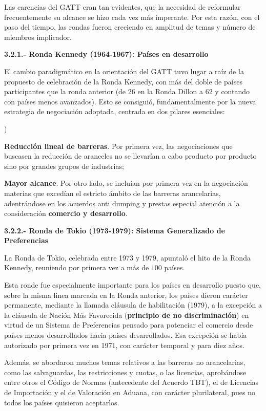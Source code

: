 \documentclass[10pt,a4paper]{article}
\newcounter{alphaitem}
\newenvironment{la}
      {\begin{list}{\alph{alphaitem})}{%
          \usecounter{alphaitem}%
          \setlength{\leftmargin}{1cm}%
          \setlength{\parskip}{3pt}%
          \setlength{\itemsep}{0pt}%
          \setlength{\parsep}{0pt}%
      }}
      {\end{list}}
\begin{document}
Las carencias del GATT eran tan evidentes, que la necesidad de reformular frecuentemente su alcance se hizo cada vez más imperante. Por esta razón, con el paso del tiempo, las rondas fueron creciendo en amplitud de temas y número de miembros implicador. 

\textbf{3.2.1.- Ronda Kennedy (1964-1967): Países en desarrollo}

El cambio paradigmático en la orientación del GATT tuvo lugar a raíz de la propuesto de celebración de la Ronda Kennedy, con más del doble de países participantes que la ronda anterior (de $26$ en la Ronda Dillon a $62$ y contando con países menos avanzados). Esto se consiguió, fundamentalmente por la nueva estrategia de negociación adoptada, centrada en dos pilares esenciales:
\begin{la}
    \item \textbf{Reducción lineal de barreras}. Por primera vez, las negociaciones que buscasen la reducción de aranceles no se llevarían a cabo producto por producto sino por grandes grupos de industrias;
    \item \textbf{Mayor alcance}. Por otro lado, se incluían por primera vez en la negociación materias que excedían el estricto ámbito de las barreras arancelarias, adentrándose en los acuerdos anti dumping y prestas especial atención a la consideración \textbf{comercio y desarrollo}.
\end{la}

\textbf{3.2.2.- Ronda de Tokio (1973-1979): Sistema Generalizado de Preferencias}

La Ronda de Tokio, celebrada entre 1973 y 1979, apuntaló el hito de la Ronda Kennedy, reuniendo por primera vez a más de $100$ países. 

Esta ronde fue especialmente importante para los países en desarrollo puesto que, sobre la misma linea marcada en la Ronda anterior, los países dieron carácter permanente, mediante la llamada cláusula de habilitación (1979), a la excepción a la cláusula de Nación Más Favorecida (\textbf{principio de no discriminación}) en virtud de un Sistema de Preferencias pensado para potenciar el comercio desde países menos desarrollados hacia países desarrollados. Esa excepción se había autorizado por primera vez en 1971, con carácter temporal y para diez años. 

Además, se abordaron muchos temas relativos a las barreras no arancelarias, como las salvaguardas, las restricciones y cuotas, o las licencias, aprobándose entre otros el Código de Normas (antecedente del Acuerdo TBT), el de Licencias de Importación y el de Valoración en Aduana, con carácter plurilateral, pues no todos los países quisieron aceptarlos. 
\end{document}
